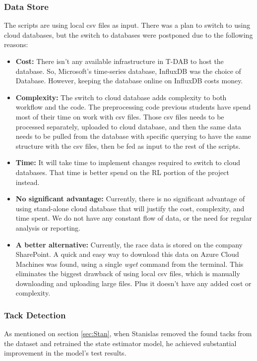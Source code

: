 \documentclass[12pt,twoside]{report}
\begin{document}
\subsubsection{Data Store}
The scripts are using local csv files as input. There was a plan to switch to using cloud databases, but the switch to databases were postponed due to the following reasons:

\begin{itemize}
  \item \textbf{Cost:} There isn't any available infrastructure in T-DAB to host the database. So, Microsoft's time-series database, InfluxDB was the choice of Database. However, keeping the database online on InfluxDB costs money.
  \item \textbf{Complexity:} The switch to cloud database adds complexity to both workflow and the code. The preprocessing code previous students have spend most of their time on work with csv files. Those csv files needs to be processed separately, uploaded to cloud database, and then the same data needs to be pulled from the database with specific querying to have the same structure with the csv files, then be fed as input to the rest of the scripts.
  \item \textbf{Time:} It will take time to implement changes required to switch to cloud databases. That time is better spend on the RL portion of the project instead.
  \item \textbf{No significant advantage:} Currently, there is no significant advantage of using stand-alone cloud database that will justify the cost, complexity, and time spent. We do not have any constant flow of data, or the need for regular analysis or reporting.
  \item \textbf{A better alternative:} Currently, the race data is stored on the company SharePoint. A quick and easy way to download this data on Azure Cloud Machines was found, using a single \textit{wget} command from the terminal. This eliminates the biggest drawback of using local csv files, which is manually downloading and uploading large files. Plus it doesn't have any added cost or complexity.
\end{itemize}

\subsubsection{Tack Detection}
As mentioned on section \ref{sec:Stan}, when Stanislas removed the found tacks from the dataset and retrained the state estimator model, he achieved substantial improvement in the model's test results. 
\end{document}
